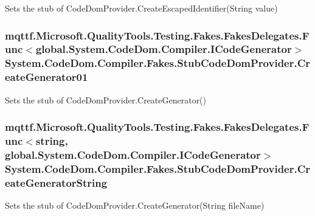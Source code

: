 Sets the stub of Code\-Dom\-Provider.\-Create\-Escaped\-Identifier(\-String value)

\hypertarget{class_system_1_1_code_dom_1_1_compiler_1_1_fakes_1_1_stub_code_dom_provider_a1c07f8c5776eb9aa0fd95814c7ad6263}{
\subsubsection[{Create\-Generator01}]{\setlength{\rightskip}{0pt plus 5cm}mqttf.\-Microsoft.\-Quality\-Tools.\-Testing.\-Fakes.\-Fakes\-Delegates.\-Func$<$global.\-System.\-Code\-Dom.\-Compiler.\-I\-Code\-Generator$>$ System.\-Code\-Dom.\-Compiler.\-Fakes.\-Stub\-Code\-Dom\-Provider.\-Create\-Generator01}}\label{class_system_1_1_code_dom_1_1_compiler_1_1_fakes_1_1_stub_code_dom_provider_a1c07f8c5776eb9aa0fd95814c7ad6263}


Sets the stub of Code\-Dom\-Provider.\-Create\-Generator()

\hypertarget{class_system_1_1_code_dom_1_1_compiler_1_1_fakes_1_1_stub_code_dom_provider_a93a5ff933d4c992506e924031f970e89}{
\subsubsection[{Create\-Generator\-String}]{\setlength{\rightskip}{0pt plus 5cm}mqttf.\-Microsoft.\-Quality\-Tools.\-Testing.\-Fakes.\-Fakes\-Delegates.\-Func$<$string, global.\-System.\-Code\-Dom.\-Compiler.\-I\-Code\-Generator$>$ System.\-Code\-Dom.\-Compiler.\-Fakes.\-Stub\-Code\-Dom\-Provider.\-Create\-Generator\-String}}\label{class_system_1_1_code_dom_1_1_compiler_1_1_fakes_1_1_stub_code_dom_provider_a93a5ff933d4c992506e924031f970e89}


Sets the stub of Code\-Dom\-Provider.\-Create\-Generator(\-String file\-Name)


